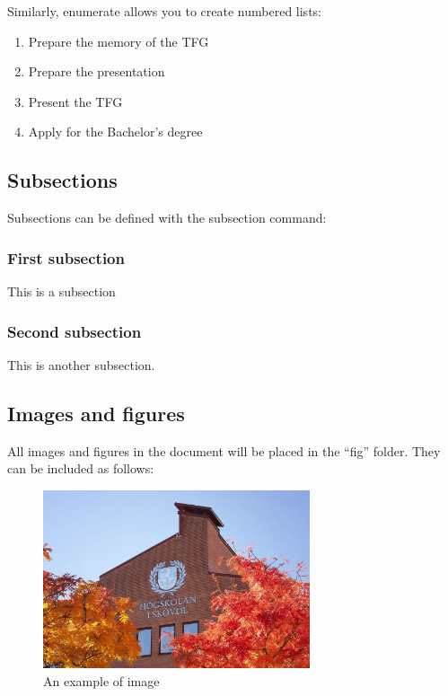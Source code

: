 Similarly, enumerate allows you to create numbered lists:

\begin{enumerate}
     \item Prepare the memory of the TFG
     \item Prepare the presentation
     \item Present the TFG
     \item Apply for the Bachelor's degree
\end{enumerate}

\subsection{Subsections}
Subsections can be defined with the subsection command:

\subsubsection{First subsection}\label{sec:subsection}
This is a subsection

\subsubsection{Second subsection}
This is another subsection.

\subsection{Images and figures}
All images and figures in the document will be placed in the ``fig'' folder. They can be included as follows:

\begin{figure}[htp]
    \centering
    \includegraphics[width=0.7\textwidth]{images/skovde.jpg}
    \caption{An example of image}
    \label{fig:example}
\end{figure}

